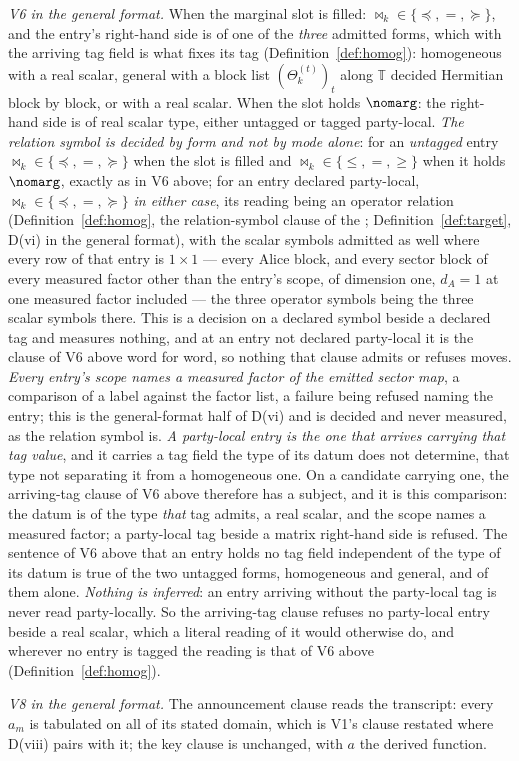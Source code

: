 \begin{definition}
\emph{V6 in the general format.} When the marginal slot is filled:
$\bowtie_k\in\{\preceq,=,\succeq\}$, and the entry's right-hand side is of
one of the \emph{three} admitted forms, which with the arriving tag field is
what fixes its tag (Definition~\ref{def:homog}): homogeneous with a real
scalar, general with a block list $(\Theta^{(t)}_k)_t$ along $\mathbb{T}$
decided Hermitian block by block, or  with a real scalar. When the
slot holds $\nomarg$: the right-hand side is of real scalar type, either
untagged or tagged party-local. \emph{The relation symbol is decided by form
and not by mode alone}: for an \emph{untagged} entry
$\bowtie_k\in\{\preceq,=,\succeq\}$ when the slot is filled and
$\bowtie_k\in\{\le,=,\ge\}$ when it holds $\nomarg$, exactly as in V6 above;
for an entry declared party-local, $\bowtie_k\in\{\preceq,=,\succeq\}$
\emph{in either case}, its reading being an operator relation
(Definition~\ref{def:homog}, the relation-symbol clause of the ; Definition~\ref{def:target}, D(vi) in the general format), with the
scalar symbols admitted as well where every row of that entry is $1\times1$
--- every Alice block, and every sector block of every measured factor other
than the entry's scope, of dimension one, $d_A=1$ at one measured factor
included --- the three operator symbols being the three scalar symbols there.
This is a decision on a declared symbol beside a declared tag and measures
nothing, and at an entry not declared party-local it is the clause of V6
above word for word, so nothing that clause admits or refuses moves.
\emph{Every entry's scope names a measured factor of the emitted sector map},
a comparison of a label against the factor list, a failure being refused
naming the entry; this is the general-format half of D(vi) and is decided and
never measured, as the relation symbol is. \emph{A party-local entry is the
one that arrives carrying that tag value}, and it carries a tag field the
type of its datum does not determine, that type not separating it from a
homogeneous one. On a candidate carrying one, the arriving-tag clause of V6
above therefore has a subject, and it is this comparison: the datum is of the
type \emph{that} tag admits, a real scalar, and the scope names a measured
factor; a party-local tag beside a matrix right-hand side is refused. The
sentence of V6 above that an entry holds no tag field independent of the type
of its datum is true of the two untagged forms, homogeneous and general, and
of them alone. \emph{Nothing is inferred}: an entry arriving without the
party-local tag is never read party-locally. So the arriving-tag clause
refuses no party-local entry beside a real scalar, which a literal reading of it
would otherwise do, and wherever no entry is tagged the reading is that of V6
above (Definition~\ref{def:homog}).

\emph{V8 in the general format.} The announcement clause reads the
transcript: every $a_m$ is tabulated on all of its stated domain, which is
V1's clause restated where D(viii) pairs with it; the key clause is unchanged,
with $a$ the derived function.
\end{definition}
